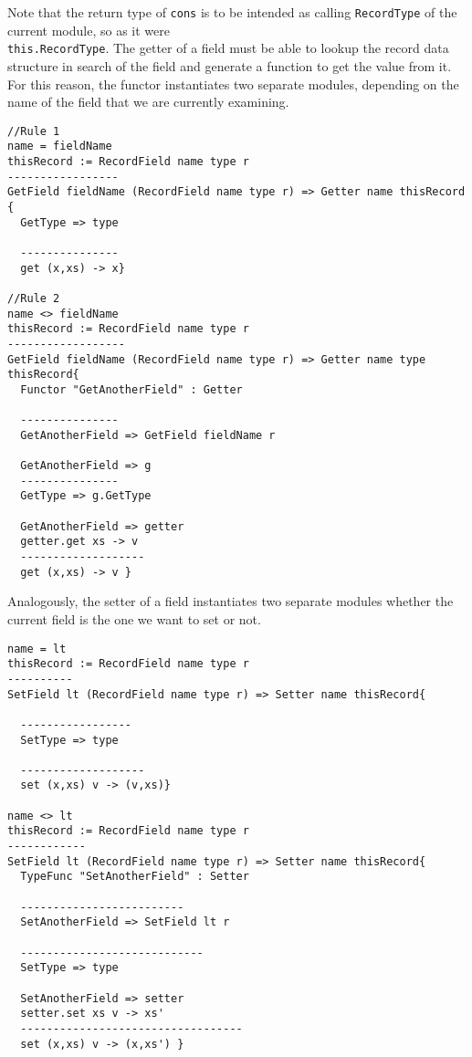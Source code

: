 \noindent
Note that the return type of \texttt{cons} is to be intended as calling \texttt{RecordType} of the current module, so as it were \\ \texttt{this.RecordType}.
The getter of a field must be able to lookup the record data structure in search of the field and generate a function to get the value from it. For this reason, the functor instantiates two separate modules, depending on the name of the field that we are currently examining.

\begin{lstlisting}[caption = Module instantiations for getters, label = code:getters]
//Rule 1
name = fieldName
thisRecord := RecordField name type r
-----------------
GetField fieldName (RecordField name type r) => Getter name thisRecord {
  GetType => type
  
  ---------------
  get (x,xs) -> x}

//Rule 2
name <> fieldName
thisRecord := RecordField name type r
------------------
GetField fieldName (RecordField name type r) => Getter name type thisRecord{
  Functor "GetAnotherField" : Getter
  
  ---------------
  GetAnotherField => GetField fieldName r
  
  GetAnotherField => g
  ---------------
  GetType => g.GetType
  
  GetAnotherField => getter
  getter.get xs -> v
  -------------------
  get (x,xs) -> v }
\end{lstlisting}

\noindent
Analogously, the setter of a field instantiates two separate modules whether the current field is the one we want to set or not.

\begin{lstlisting}[caption = Module instantiations for setters, label = code:setters]
name = lt
thisRecord := RecordField name type r
----------
SetField lt (RecordField name type r) => Setter name thisRecord{
  
  -----------------
  SetType => type
  
  -------------------
  set (x,xs) v -> (v,xs)}

name <> lt
thisRecord := RecordField name type r
------------
SetField lt (RecordField name type r) => Setter name thisRecord{
  TypeFunc "SetAnotherField" : Setter
  
  -------------------------
  SetAnotherField => SetField lt r
  
  ----------------------------
  SetType => type
  
  SetAnotherField => setter
  setter.set xs v -> xs'
  ----------------------------------
  set (x,xs) v -> (x,xs') }
\end{lstlisting}

